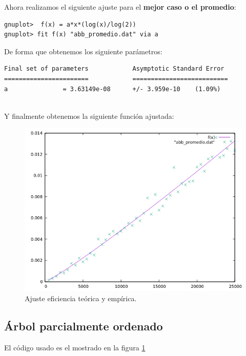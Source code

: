 Ahora realizamos el siguiente ajuste para el \textbf{mejor caso o el promedio}:
\begin{shaded*}
\begin{verbatim}
gnuplot>  f(x) = a*x*(log(x)/log(2))
gnuplot> fit f(x) "abb_promedio.dat" via a

\end{verbatim}
\end{shaded*}

De forma que obtenemos los siguiente parámetros:

\begin{shaded*}
\begin{verbatim}
Final set of parameters            Asymptotic Standard Error
=======================            ==========================
a               = 3.63149e-08      +/- 3.959e-10    (1.09%)


\end{verbatim}
\end{shaded*}

Y finalmente obtenemos la siguiente función ajustada:
\begin{figure}[H]
    \begin{center}
        \includegraphics[scale=0.7]{imagenes/abb_adjm.png}
        \caption{Ajuste eficiencia teórica y empírica.}
        \label{fig21}
    \end{center}
\end{figure}

\subsection{Árbol parcialmente ordenado}
El código usado es el mostrado en la figura  \ref{fig21}

